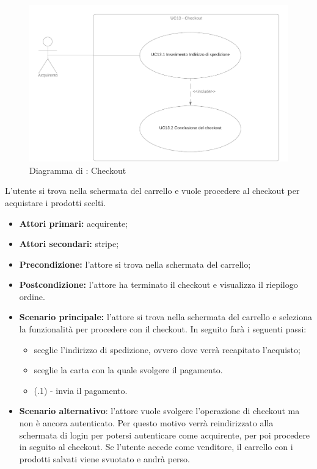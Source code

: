 

\begin{figure}[H]
    \centering
    \includegraphics[scale=0.4]{Immagini/DiagrammiUC/UC13Checkout.png}
    \caption{Diagramma di \actualUC: Checkout} 
    \label{fig:Checkout}
\end{figure}

L'utente si trova nella schermata del carrello e vuole procedere al checkout per acquistare i prodotti scelti.
\begin{itemize}
    \item \textbf{Attori primari:} acquirente;
    \item \textbf{Attori secondari:} stripe;
    \item \textbf{Precondizione:} l'attore si trova nella schermata del carrello;
    \item \textbf{Postcondizione:} l'attore ha terminato il checkout e visualizza il riepilogo ordine.
    \item \textbf{Scenario principale:} l'attore si trova nella schermata del carrello e seleziona la funzionalità per procedere con il checkout. In seguito farà i seguenti passi:
    \begin{itemize}
    	\item sceglie l'indirizzo di spedizione, ovvero dove verrà recapitato l'acquisto;
    	\item sceglie la carta con la quale svolgere il pagamento.
        \item (\actualUC.1) - invia il pagamento.
    \end{itemize}
    \item \textbf{Scenario alternativo}: l'attore vuole svolgere l'operazione di checkout ma non è ancora autenticato. Per questo motivo verrà reindirizzato alla schermata di login per potersi autenticare come acquirente, per poi procedere in seguito al checkout. Se l'utente accede come venditore, il carrello con i prodotti salvati viene svuotato e andrà perso.
\end{itemize}

